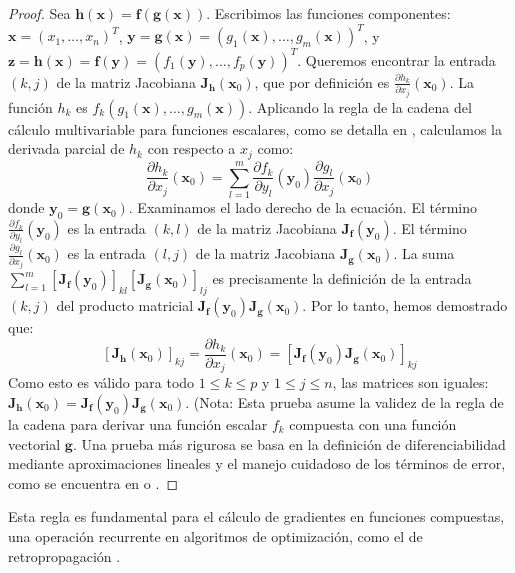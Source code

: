 \begin{proof}
Sea $\mathbf{h}(\mathbf{x}) = \mathbf{f}(\mathbf{g}(\mathbf{x}))$. Escribimos las funciones componentes: $\mathbf{x} = (x_1, \dots, x_n)^T$, $\mathbf{y} = \mathbf{g}(\mathbf{x}) = (g_1(\mathbf{x}), \dots, g_m(\mathbf{x}))^T$, y $\mathbf{z} = \mathbf{h}(\mathbf{x}) = \mathbf{f}(\mathbf{y}) = (f_1(\mathbf{y}), \dots, f_p(\mathbf{y}))^T$.
Queremos encontrar la entrada $(k,j)$ de la matriz Jacobiana $\mathbf{J}_{\mathbf{h}}(\mathbf{x}_0)$, que por definición es $\frac{\partial h_k}{\partial x_j}(\mathbf{x}_0)$. La función $h_k$ es $f_k(g_1(\mathbf{x}), \dots, g_m(\mathbf{x}))$.
Aplicando la regla de la cadena del cálculo multivariable para funciones escalares, como se detalla en \citet{Apostol1974}, calculamos la derivada parcial de $h_k$ con respecto a $x_j$ como:
\[ \frac{\partial h_k}{\partial x_j}(\mathbf{x}_0) = \sum_{l=1}^{m} \frac{\partial f_k}{\partial y_l}(\mathbf{y}_0) \frac{\partial g_l}{\partial x_j}(\mathbf{x}_0) \]
donde $\mathbf{y}_0 = \mathbf{g}(\mathbf{x}_0)$.
Examinamos el lado derecho de la ecuación. El término $\frac{\partial f_k}{\partial y_l}(\mathbf{y}_0)$ es la entrada $(k,l)$ de la matriz Jacobiana $\mathbf{J}_{\mathbf{f}}(\mathbf{y}_0)$. El término $\frac{\partial g_l}{\partial x_j}(\mathbf{x}_0)$ es la entrada $(l,j)$ de la matriz Jacobiana $\mathbf{J}_{\mathbf{g}}(\mathbf{x}_0)$.
La suma $\sum_{l=1}^{m} [\mathbf{J}_{\mathbf{f}}(\mathbf{y}_0)]_{kl} [\mathbf{J}_{\mathbf{g}}(\mathbf{x}_0)]_{lj}$ es precisamente la definición de la entrada $(k,j)$ del producto matricial $\mathbf{J}_{\mathbf{f}}(\mathbf{y}_0) \mathbf{J}_{\mathbf{g}}(\mathbf{x}_0)$.
Por lo tanto, hemos demostrado que:
\[ [\mathbf{J}_{\mathbf{h}}(\mathbf{x}_0)]_{kj} = \frac{\partial h_k}{\partial x_j}(\mathbf{x}_0) = [\mathbf{J}_{\mathbf{f}}(\mathbf{y}_0) \mathbf{J}_{\mathbf{g}}(\mathbf{x}_0)]_{kj} \]
Como esto es válido para todo $1 \le k \le p$ y $1 \le j \le n$, las matrices son iguales: $\mathbf{J}_{\mathbf{h}}(\mathbf{x}_0) = \mathbf{J}_{\mathbf{f}}(\mathbf{y}_0) \mathbf{J}_{\mathbf{g}}(\mathbf{x}_0)$.
(Nota: Esta prueba asume la validez de la regla de la cadena para derivar una función escalar $f_k$ compuesta con una función vectorial $\mathbf{g}$. Una prueba más rigurosa se basa en la definición de diferenciabilidad mediante aproximaciones lineales y el manejo cuidadoso de los términos de error, como se encuentra en \citet{Apostol1974} o \citet{Rudin1976}.
\end{proof}

Esta regla es fundamental para el cálculo de gradientes en funciones compuestas, una operación recurrente en algoritmos de optimización, como el de retropropagación \citep{rumelhart_learning_1986, goodfellow_deep_2016}.

